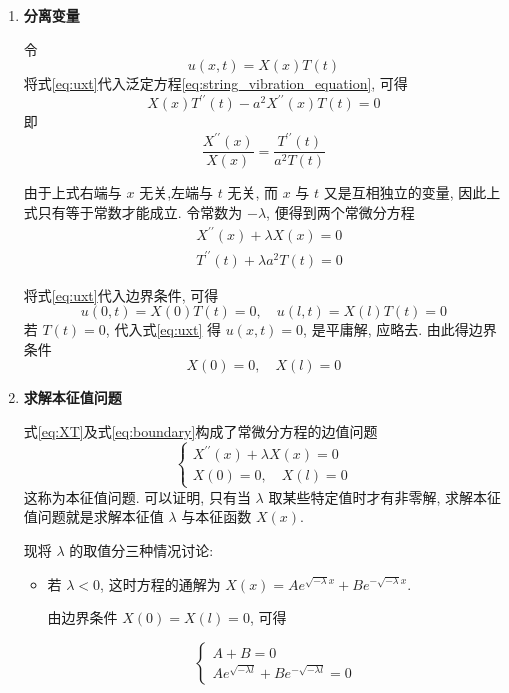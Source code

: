 \begin{enumerate}
  \item \textbf{分离变量}

    令
    \begin{equation}
        u(x, t)=X(x) T(t)
        \label{eq:uxt}
    \end{equation}
    将式\eqref{eq:uxt}代入泛定方程\eqref{eq:string_vibration_equation}, 可得
    $$
    X(x) T^{\prime \prime}(t)-a^{2} X^{\prime \prime}(x) T(t)=0
    $$
即
$$
\frac{X^{\prime \prime}(x)}{X(x)}=\frac{T^{\prime \prime}(t)}{a^{2} T(t)}
$$

由于上式右端与 $x$ 无关,左端与 $t$ 无关, 而 $x$ 与 $t$ 又是互相独立的变量, 
因此上式只有等于常数才能成立. 令常数为 $-\lambda$, 便得到两个常微分方程
\begin{equation}
    \begin{aligned}
        & X^{\prime \prime}(x)+\lambda X(x)=0 \\
        & T^{\prime \prime}(t)+\lambda a^{2} T(t)=0
        \end{aligned}
        \label{eq:XT}
\end{equation}

将式\eqref{eq:uxt}代入边界条件, 可得
$$
u(0, t)=X(0) T(t)=0, \quad u(l, t)=X(l) T(t)=0
$$
若 $T(t)=0$, 代入式\eqref{eq:uxt} 得 $u(x, t)=0$, 是平庸解, 应略去. 由此得边界条件
\begin{equation}
    X(0)=0, \quad X(l)=0
    \label{eq:boundary}
\end{equation}

\item \textbf{求解本征值问题}

式\eqref{eq:XT}及式\eqref{eq:boundary}构成了常微分方程的边值问题
$$
\left\{\begin{array}{l}
X^{\prime \prime}(x)+\lambda X(x)=0 \\
X(0)=0, \quad X(l)=0
\end{array}\right.
$$
这称为本征值问题. 
可以证明, 只有当 $\lambda$ 取某些特定值时才有非零解,
求解本征值问题就是求解本征值 $\lambda$ 与本征函数 $X(x)$.

现将 $\lambda$ 的取值分三种情况讨论:

\begin{itemize}
    \item 若 $\lambda<0$, 这时方程的通解为 $X(x)=A e^{\sqrt{-\lambda} x}+B e^{-\sqrt{-\lambda} x}$.

        由边界条件 $X(0)=X(l)=0$, 可得
        
        $$
        \left\{\begin{array}{l}
        A+B=0 \\
        A e^{\sqrt{-\lambda l}}+B e^{-\sqrt{-\lambda l}}=0
        \end{array}\right.
        $$
        

\end{itemize}
\end{enumerate}
